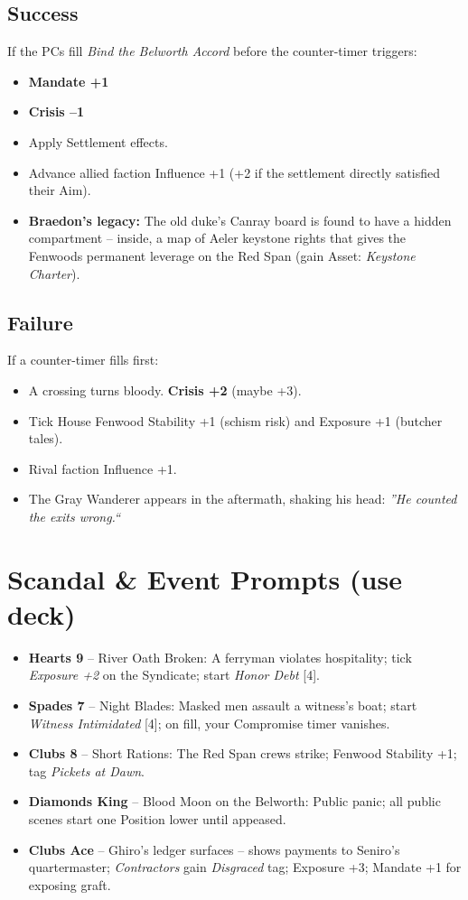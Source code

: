 \documentclass[11pt]{article}
\begin{document}
\subsection*{Success}
If the PCs fill \textit{Bind the Belworth Accord} before the counter-timer triggers:
\begin{itemize}
  \item \textbf{Mandate +1}
  \item \textbf{Crisis --1}
  \item Apply Settlement effects.
  \item Advance allied faction Influence +1 (+2 if the settlement directly satisfied their Aim).
  \item \textbf{Braedon's legacy:} The old duke's Canray board is found to have a hidden compartment -- inside, a map of Aeler keystone rights that gives the Fenwoods permanent leverage on the Red Span (gain Asset: \textit{Keystone Charter}).
\end{itemize}

\subsection*{Failure}
If a counter-timer fills first:
\begin{itemize}
  \item A crossing turns bloody. \textbf{Crisis +2} (maybe +3).
  \item Tick House Fenwood Stability +1 (schism risk) and Exposure +1 (butcher tales).
  \item Rival faction Influence +1.
  \item The Gray Wanderer appears in the aftermath, shaking his head: \textit{''He counted the exits wrong.``}
\end{itemize}

\section*{Scandal \& Event Prompts (use deck)}
\begin{itemize}
  \item \textbf{Hearts 9} -- River Oath Broken: A ferryman violates hospitality; tick \textit{Exposure +2} on the Syndicate; start \textit{Honor Debt} [4].
  \item \textbf{Spades 7} -- Night Blades: Masked men assault a witness's boat; start \textit{Witness Intimidated} [4]; on fill, your Compromise timer vanishes.
  \item \textbf{Clubs 8} -- Short Rations: The Red Span crews strike; Fenwood Stability +1; tag \textit{Pickets at Dawn}.
  \item \textbf{Diamonds King} -- Blood Moon on the Belworth: Public panic; all public scenes start one Position lower until appeased.
  \item \textbf{Clubs Ace} -- Ghiro's ledger surfaces -- shows payments to Seniro's quartermaster; \textit{Contractors} gain \textit{Disgraced} tag; Exposure +3; Mandate +1 for exposing graft.
\end{itemize}
\end{document}
